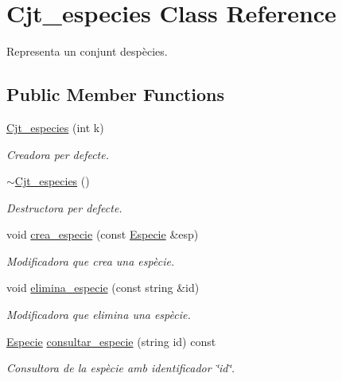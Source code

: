 \hypertarget{class_cjt__especies}{}\section{Cjt\+\_\+especies Class Reference}
\label{class_cjt__especies}


Representa un conjunt d\textquotesingle{}espècies.  


\subsection*{Public Member Functions}
\begin{DoxyCompactItemize}
\item 
\hyperlink{class_cjt__especies_a0f07bec6607cc362c3d176476e8045b9}{Cjt\+\_\+especies} (int k)
\begin{DoxyCompactList}\small\item\em Creadora per defecte. \end{DoxyCompactList}\item 
\hyperlink{class_cjt__especies_a05182978f6fff11a0fa1cec49514dd5e}{$\sim$\+Cjt\+\_\+especies} ()
\begin{DoxyCompactList}\small\item\em Destructora per defecte. \end{DoxyCompactList}\item 
void \hyperlink{class_cjt__especies_aa670b5a7cbd3df7ffababe566db93e13}{crea\+\_\+especie} (const \hyperlink{class_especie}{Especie} \&esp)
\begin{DoxyCompactList}\small\item\em Modificadora que crea una espècie. \end{DoxyCompactList}\item 
void \hyperlink{class_cjt__especies_a51059c15bd4c38ff5f21dbb532befa11}{elimina\+\_\+especie} (const string \&id)
\begin{DoxyCompactList}\small\item\em Modificadora que elimina una espècie. \end{DoxyCompactList}\item 
\hyperlink{class_especie}{Especie} \hyperlink{class_cjt__especies_a3584d5ece74d4260ebd7415a8c7554e5}{consultar\+\_\+especie} (string id) const
\begin{DoxyCompactList}\small\item\em Consultora de la espècie amb identificador \char`\"{}id\char`\"{}. \end{DoxyCompactList}\item 

\end{DoxyCompactItemize}
